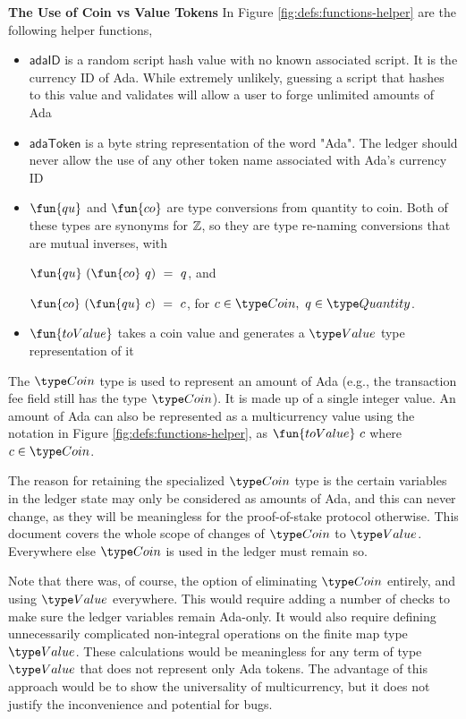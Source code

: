 \textbf{The Use of Coin vs Value Tokens}
In Figure \ref{fig:defs:functions-helper} are the following helper functions,

\begin{itemize}
  \item $\mathsf{adaID}$ is a random script hash value with no known associated
  script. It is the currency ID of Ada. While extremely unlikely, guessing a
  script that hashes to this value
  and validates will allow a user to forge unlimited amounts of Ada
  \item $\mathsf{adaToken}$ is a byte string representation of the word "Ada".
  The ledger should never allow the use of any other token name associated
  with Ada's currency ID
  \item $\fun{qu}$ and $\fun{co}$ are type conversions from quantity to
  coin. Both of these types are synonyms for $\mathbb{Z}$, so they are
  type re-naming conversions that are mutual inverses, with

  $\fun{qu} ~(\fun{co} ~q )~= ~q$, and

  $\fun{co}~ (\fun{qu}~ c) ~=~ c$, for $c \in \Coin,~q \in \Quantity$.

  \item $\fun{toValue}$ takes a coin value and generates a $\Value$ type representation
  of it
\end{itemize}

The $\Coin$ type is used to represent an amount of Ada (e.g., the transaction
fee field still has the type $\Coin$). It is made up of a single
integer value. An amount of Ada can also be represented as a multicurrency value
using the notation in Figure \ref{fig:defs:functions-helper}, as
$\fun{toValue}~c$ where $c \in \Coin$.

The reason for retaining the specialized $\Coin$ type is the certain variables
in the ledger state may only be considered as amounts of Ada, and this can
never change, as they will be meaningless for the proof-of-stake protocol
otherwise. This document
covers the whole scope of changes of $\Coin$ to $\Value$. Everywhere else $\Coin$
is used in the ledger must remain so.

Note that there was, of course, the option of eliminating $\Coin$ entirely,
and using $\Value$ everywhere. This would require adding a number of checks
to make sure the ledger variables remain Ada-only. It would also require
defining unnecessarily complicated non-integral operations on the finite map
type $\Value$. These calculations would be meaningless for any term of type
$\Value$ that does not represent only Ada tokens. The advantage of this approach
would be to show the universality of multicurrency, but it does not
justify the inconvenience and potential for bugs.

